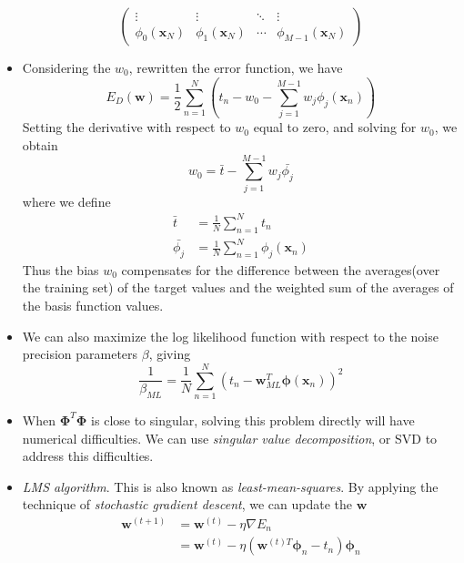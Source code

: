 \documentclass[12pt, a4paper]{article}
\begin{document}
\begin{itemize}
\begin{equation*}
\begin{pmatrix}
                \vdots & \vdots & \ddots & \vdots\\
                \phi_0(\bm{x}_N) & \phi_1(\bm{x}_N) & \cdots & \phi_{M-1}(\bm{x}_N)
            \end{pmatrix}
        \end{equation*}
        \item Considering the $w_0$, rewritten the error function, we have
        \begin{equation*}
            E_D(\bm{w})=\frac{1}{2}\sum_{n=1}^N(t_n-w_0-\sum_{j=1}^{M-1}w_j\phi_j(\bm{x}_n))
        \end{equation*}
        Setting the derivative with respect to $w_0$ equal to zero, and solving for $w_0$, we obtain 
        \begin{equation*}
            w_0=\bar{t}-\sum_{j=1}^{M-1}w_j\bar{\phi_j}
        \end{equation*}
        where we define
        \begin{align*}
            \bar{t}&=\frac{1}{N}\sum_{n=1}^Nt_n\\
            \bar{\phi_j}&=\frac{1}{N}\sum_{n=1}^N\phi_j(\bm{x}_n)
        \end{align*}
        Thus the bias $w_0$ compensates for the difference between the averages(over the training set) of 
        the target values and the weighted sum of the averages of the basis function values.
        \item We can also maximize the log likelihood function with respect to the noise precision parameters
        $\beta$, giving
        \begin{equation*}
            \frac{1}{\beta_{ML}}=\frac{1}{N}\sum_{n=1}^N(t_n-\bm{w}_{ML}^T\bm{\phi}(\bm{x}_n))^2
        \end{equation*}
        \item When $\bm{\Phi}^T\bm{\Phi}$ is close to singular, solving this problem directly will have 
        numerical difficulties. We can use \textit{singular value decomposition}, or SVD to address this 
        difficulties.
        \item \textit{LMS algorithm}. This is also known as \textit{least-mean-squares}. By applying the 
        technique of \textit{stochastic gradient descent}, we can update the $\bm{w}$
        \begin{align*}
            \bm{w}^{(t+1)}&=\bm{w}^{(t)}-\eta\nabla E_n\\
            &=\bm{w}^{(t)}-\eta(\bm{w}^{(t)T} \bm{\phi}_n-t_n)\bm{\phi}_n
        \end{align*}

\end{itemize}
\end{document}
